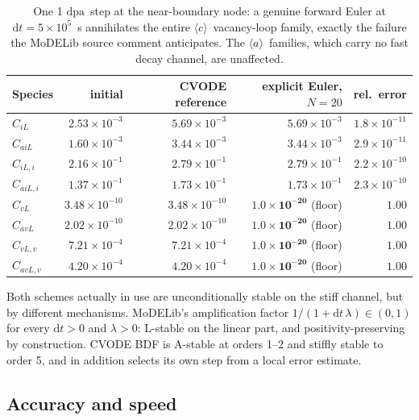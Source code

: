 \documentclass[11pt,a4paper]{article}
\newcommand{\dpa}{\ensuremath{\mathrm{dpa}}}
\newcommand{\aloop}{\ensuremath{\langle a\rangle}}
\newcommand{\cloop}{\ensuremath{\langle c\rangle}}
\begin{document}
\begin{table}[htb]
\centering
\caption{One 1 \dpa\ step at the near-boundary node: a genuine forward Euler at
$\mathrm dt=5\times10^{5}$~s annihilates the entire \cloop\ vacancy-loop family,
exactly the failure the MoDELib source comment anticipates. The \aloop\ families,
which carry no fast decay channel, are unaffected.}
\label{tab:collapse}
\begin{tabular}{lrrrr}
\toprule
Species & initial & CVODE reference & explicit Euler, $N=20$ & rel.\ error \\
\midrule
$C_{iL}$   & $2.53\times10^{-3}$ & $5.69\times10^{-3}$ & $5.69\times10^{-3}$ & $1.8\times10^{-11}$ \\
$C_{aiL}$  & $1.60\times10^{-3}$ & $3.44\times10^{-3}$ & $3.44\times10^{-3}$ & $2.9\times10^{-11}$ \\
$C_{iL,i}$ & $2.16\times10^{-1}$ & $2.79\times10^{-1}$ & $2.79\times10^{-1}$ & $2.2\times10^{-10}$ \\
$C_{aiL,i}$& $1.37\times10^{-1}$ & $1.73\times10^{-1}$ & $1.73\times10^{-1}$ & $2.3\times10^{-10}$ \\
\midrule
$C_{vL}$   & $3.48\times10^{-10}$ & $3.48\times10^{-10}$ & $\mathbf{1.0\times10^{-20}}$ (floor) & $1.00$ \\
$C_{avL}$  & $2.02\times10^{-10}$ & $2.02\times10^{-10}$ & $\mathbf{1.0\times10^{-20}}$ (floor) & $1.00$ \\
$C_{vL,v}$ & $7.21\times10^{-4}$  & $7.21\times10^{-4}$  & $\mathbf{1.0\times10^{-20}}$ (floor) & $1.00$ \\
$C_{avL,v}$& $4.20\times10^{-4}$  & $4.20\times10^{-4}$  & $\mathbf{1.0\times10^{-20}}$ (floor) & $1.00$ \\
\bottomrule
\end{tabular}
\end{table}

Both schemes actually in use are unconditionally stable on the stiff channel,
but by different mechanisms. MoDELib's amplification factor
$1/(1+\mathrm dt\,\lambda)\in(0,1)$ for every $\mathrm dt>0$ and $\lambda>0$:
L-stable on the linear part, and positivity-preserving by construction. CVODE
BDF is A-stable at orders 1--2 and stiffly stable to order 5, and in addition
selects its own step from a local error estimate.

\subsection{Accuracy and speed}
\end{document}
